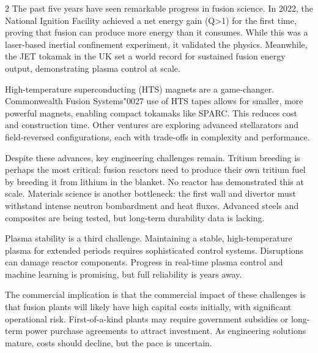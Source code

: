 \documentclass[10pt,a4paper]{article}
\newcommand{\BOApos}{{\BOQuoteFont\char"0027}}
\begin{document}
\begin{multicols}{2}
{\small The past five years have seen remarkable progress in fusion science. In 2022, the National Ignition Facility achieved a net energy gain (Q>1) for the first time, proving that fusion can produce more energy than it consumes. While this was a laser-based inertial confinement experiment, it validated the physics. Meanwhile, the JET tokamak in the UK set a world record for sustained fusion energy output, demonstrating plasma control at scale.}\par
{\small High-temperature superconducting (HTS) magnets are a game-changer. Commonwealth Fusion Systems\BOApos{} use of HTS tapes allows for smaller, more powerful magnets, enabling compact tokamaks like SPARC. This reduces cost and construction time. Other ventures are exploring advanced stellarators and field-reversed configurations, each with trade-offs in complexity and performance.}\par
{\small Despite these advances, key engineering challenges remain. Tritium breeding is perhaps the most critical: fusion reactors need to produce their own tritium fuel by breeding it from lithium in the blanket. No reactor has demonstrated this at scale. Materials science is another bottleneck: the first wall and divertor must withstand intense neutron bombardment and heat fluxes. Advanced steels and composites are being tested, but long-term durability data is lacking.}\par
{\small Plasma stability is a third challenge. Maintaining a stable, high-temperature plasma for extended periods requires sophisticated control systems. Disruptions can damage reactor components. Progress in real-time plasma control and machine learning is promising, but full reliability is years away.}\par
{\small The commercial implication is that the commercial impact of these challenges is that fusion plants will likely have high capital costs initially, with significant operational risk. First-of-a-kind plants may require government subsidies or long-term power purchase agreements to attract investment. As engineering solutions mature, costs should decline, but the pace is uncertain.}\par
\end{multicols}
\label{chap:2:end}
\end{document}
